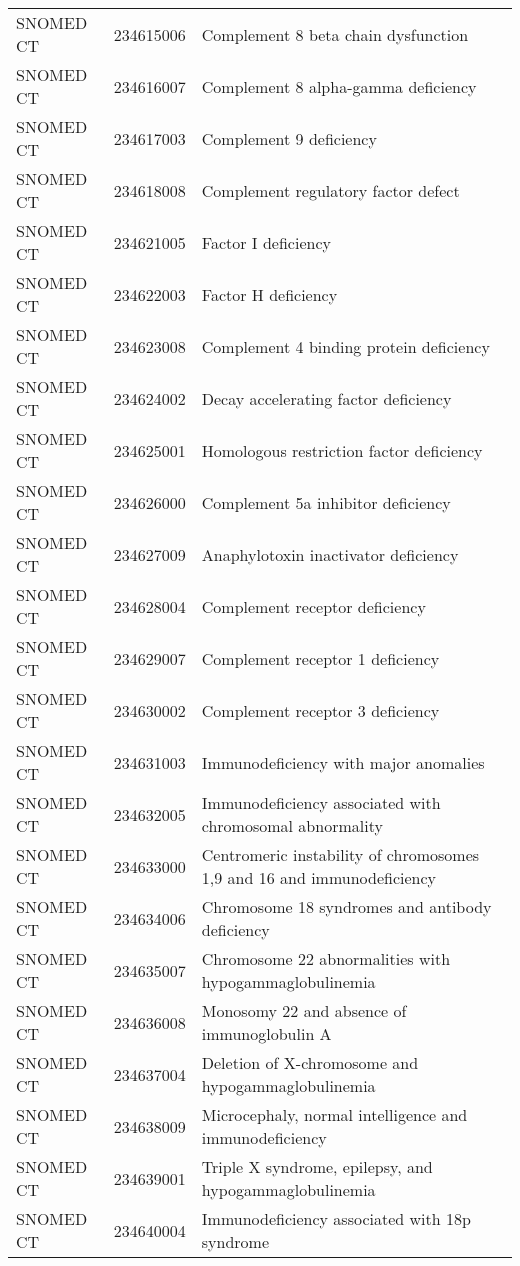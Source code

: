 \begin{table}[ht]
\begin{tabular}{lll}
  SNOMED CT & 234615006 & Complement 8 beta chain dysfunction \\ 
  SNOMED CT & 234616007 & Complement 8 alpha-gamma deficiency \\ 
  SNOMED CT & 234617003 & Complement 9 deficiency \\ 
  SNOMED CT & 234618008 & Complement regulatory factor defect \\ 
  SNOMED CT & 234621005 & Factor I deficiency \\ 
  SNOMED CT & 234622003 & Factor H deficiency \\ 
  SNOMED CT & 234623008 & Complement 4 binding protein deficiency \\ 
  SNOMED CT & 234624002 & Decay accelerating factor deficiency \\ 
  SNOMED CT & 234625001 & Homologous restriction factor deficiency \\ 
  SNOMED CT & 234626000 & Complement 5a inhibitor deficiency \\ 
  SNOMED CT & 234627009 & Anaphylotoxin inactivator deficiency \\ 
  SNOMED CT & 234628004 & Complement receptor deficiency \\ 
  SNOMED CT & 234629007 & Complement receptor 1 deficiency \\ 
  SNOMED CT & 234630002 & Complement receptor 3 deficiency \\ 
  SNOMED CT & 234631003 & Immunodeficiency with major anomalies \\ 
  SNOMED CT & 234632005 & Immunodeficiency associated with chromosomal abnormality \\ 
  SNOMED CT & 234633000 & Centromeric instability of chromosomes 1,9 and 16 and immunodeficiency \\ 
  SNOMED CT & 234634006 & Chromosome 18 syndromes and antibody deficiency \\ 
  SNOMED CT & 234635007 & Chromosome 22 abnormalities with hypogammaglobulinemia \\ 
  SNOMED CT & 234636008 & Monosomy 22 and absence of immunoglobulin A \\ 
  SNOMED CT & 234637004 & Deletion of X-chromosome and hypogammaglobulinemia \\ 
  SNOMED CT & 234638009 & Microcephaly, normal intelligence and immunodeficiency \\ 
  SNOMED CT & 234639001 & Triple X syndrome, epilepsy, and hypogammaglobulinemia \\ 
  SNOMED CT & 234640004 & Immunodeficiency associated with 18p syndrome \\ 

\end{tabular}
\end{table}

